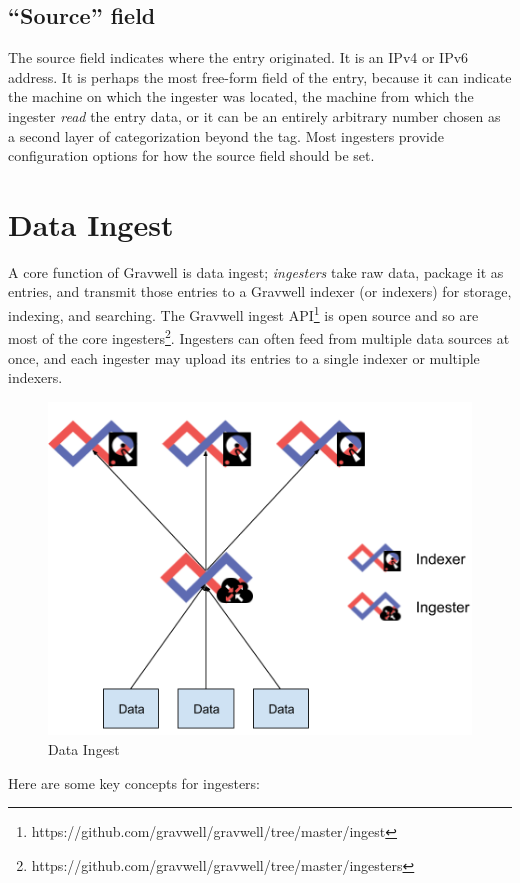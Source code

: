 \subsection{``Source'' field}

The source field indicates where the entry originated. It is an IPv4 or IPv6 address. It is perhaps the most free-form field of the entry, because it can indicate the machine on which the ingester was located, the machine from which the ingester \emph{read} the entry data, or it can be an entirely arbitrary number chosen as a second layer of categorization beyond the tag. Most ingesters provide configuration options for how the source field should be set.

\section{Data Ingest}

A core function of Gravwell is data ingest; \emph{ingesters} take raw data, package it as entries,
and transmit those entries to a Gravwell indexer (or
indexers) for storage, indexing, and searching. The Gravwell
ingest API\footnote{https://github.com/gravwell/gravwell/tree/master/ingest}
is open source and so are most of the core
ingesters\footnote{https://github.com/gravwell/gravwell/tree/master/ingesters}.  Ingesters can
often feed from multiple data sources at once, and each ingester may
upload its entries to a single indexer or multiple indexers.


\begin{figure}
	\includegraphics[width=0.6\linewidth]{images/dataingest.png}
	\caption{Data Ingest}
\end{figure}

Here are some key concepts for ingesters:


